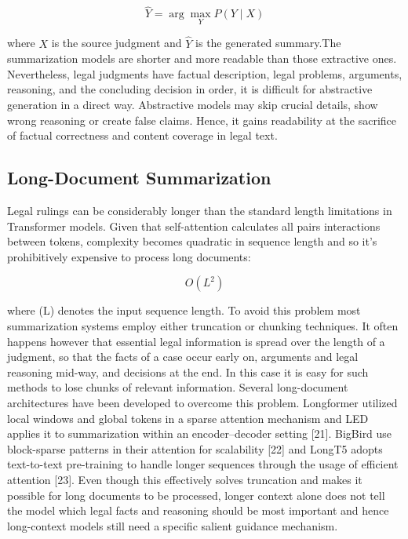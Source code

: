 \documentclass[11pt, a4paper]{article}
\theoremstyle{plain}%
\theoremstyle{remark}%
\theoremstyle{definition}%
\begin{document}
\begin{equation}
\hat{Y} = \arg\max_{Y} P(Y \mid X)
\end{equation}

where \(X\) is the source judgment and \(\hat{Y}\) is the generated summary.The summarization models are shorter and more readable than those extractive ones. Nevertheless, legal judgments have factual description, legal problems, arguments, reasoning, and the concluding decision in order, it is difficult for abstractive generation in a direct way. Abstractive models may skip crucial details, show wrong reasoning or create false claims. Hence, it gains readability at the sacrifice of factual correctness and content coverage in legal text.


\subsection{Long-Document Summarization}

Legal rulings can be considerably longer than the standard length limitations in Transformer models. Given that self-attention calculates all pairs interactions between tokens, complexity becomes quadratic in sequence length and so it's prohibitively expensive to process long documents:

\begin{equation}
O(L^{2})
\end{equation}

where (L) denotes the input sequence length. To avoid this problem most summarization systems employ either truncation or chunking techniques. It often happens however that essential legal information is spread over the length of a judgment, so that the facts of a case occur early on, arguments and legal reasoning mid-way, and decisions at the end. In this case it is easy for such methods to lose chunks of relevant information.
Several long-document architectures have been developed to overcome this problem. Longformer utilized local windows and global tokens in a sparse attention mechanism and LED applies it to summarization within an encoder--decoder setting [21]. BigBird use block-sparse patterns in their attention for scalability [22] and LongT5 adopts text-to-text pre-training to handle longer sequences through the usage of efficient attention [23]. Even though this effectively solves truncation and makes it possible for long documents to be processed, longer context alone does not tell the model which legal facts and reasoning should be most important and hence long-context models still need a specific salient guidance mechanism. 
\end{document}
